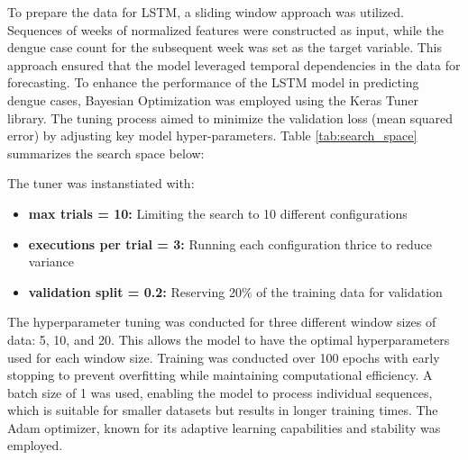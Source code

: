 To prepare the data for LSTM, a sliding window approach was utilized. Sequences of weeks of normalized features were constructed as input, while the dengue case count for the subsequent week was set as the target variable. This approach ensured that the model leveraged temporal dependencies in the data for forecasting. To enhance the performance of the LSTM model in predicting dengue cases, Bayesian Optimization was employed using the Keras Tuner library. The tuning process aimed to minimize the validation loss (mean squared error) by adjusting key model hyper-parameters. Table \ref{tab:search_space} summarizes the search space below:

\begin{table}[h!]
	\centering
	\caption{Hyperparameter Tuning: Search Space}
	\label{tab:search_space}
\end{table}



The tuner was instanstiated with:
\begin{itemize}
	\item \textbf{max trials = 10:} Limiting the search to 10 different configurations
	\item \textbf{executions per trial = 3:} Running each configuration thrice to reduce variance
	\item \textbf{validation split = 0.2:} Reserving 20\% of the training data for validation
\end{itemize}

The hyperparameter tuning was conducted for three different window sizes of data: 5, 10, and 20. This allows the model to have the optimal hyperparameters used for each window size. Training was conducted over 100 epochs with early stopping to prevent overfitting while maintaining computational efficiency. A batch size of 1 was used, enabling the model to process individual sequences, which is suitable for smaller datasets but results in longer training times. The Adam optimizer, known for its adaptive learning capabilities and stability was employed.

